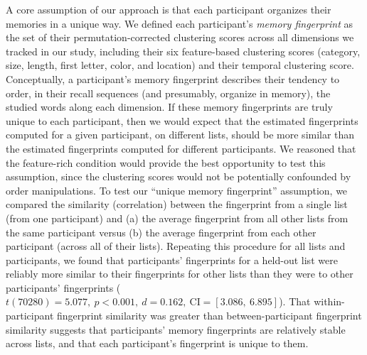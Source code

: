 \documentclass[11pt]{article}
\newcommand{\abbreviations}{S1}
\begin{document}
A core assumption of our approach is that each participant organizes their
memories in a unique way. We defined each participant's \textit{memory
fingerprint} as the set of their permutation-corrected clustering scores across
all dimensions we tracked in our study, including their six feature-based
clustering scores (category, size, length, first letter, color, and location)
and their temporal clustering score. Conceptually, a participant's memory
fingerprint describes their tendency to order, in their recall sequences (and
presumably, organize in memory), the studied words along each dimension. If
these memory fingerprints are truly unique to each participant, then we would
expect that the estimated fingerprints computed for a given participant, on
different lists, should be more similar than the estimated fingerprints
computed for different participants. We reasoned that the feature-rich
condition would provide the best opportunity to test this assumption, since the
clustering scores would not be potentially confounded by order manipulations.
To test our ``unique memory fingerprint'' assumption, we compared the
similarity (correlation) between the fingerprint from a single list (from one
participant) and (a) the average fingerprint from all other lists from the same
participant versus (b) the average fingerprint from each other participant
(across all of their lists). Repeating this procedure for all lists and
participants, we found that participants' fingerprints for a held-out list were
reliably more similar to their fingerprints for other lists than they were to
other participants' fingerprints ($t(70280) = 5.077,~p < 0.001,~d =
0.162,~\mathrm{CI} = [3.086,~6.895]$). That within-participant fingerprint
similarity was greater than between-participant fingerprint similarity suggests
that participants' memory fingerprints are relatively stable across lists, and
that each participant's fingerprint is unique to them.

\begin{table}[tp]
\centering
\tiny


\caption{\textbf{Comparing memory for early versus late lists in the
feature-rich condition.} The $t$-tests reported in the table were carried out
across-participants. Abbreviations used in this table are defined in
Table~\abbreviations.}

\label{tab:early-vs-late-feature-rich} 
\end{table}

\begin{table}[tp]
\centering
\tiny


\caption{\textbf{Comparing memory for early versus late lists in the
reduced condition.} The $t$-tests reported in the table were carried out
across-participants. Abbreviations used in this table are defined in
Table~\abbreviations.}

\label{tab:early-vs-late-reduced}
\end{table}
\end{document}

